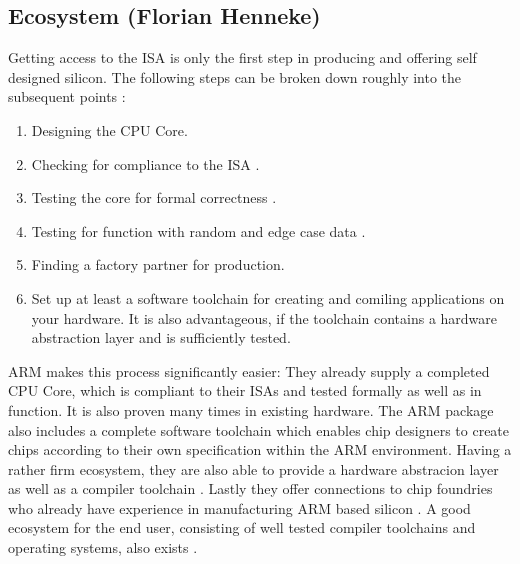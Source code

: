 \documentclass[conference]{IEEEtran}
\begin{document}
	\subsection{Ecosystem (Florian Henneke)}
	\label{ecosystem}
	Getting access to the ISA is only the first step in producing and offering self designed silicon.
	The following steps can be broken down roughly into the subsequent points \cite{ARM2019}:
	\begin{enumerate}
		\item Designing the CPU Core.
		\item Checking for compliance to the ISA \cite{Bartley2020}.
		\item Testing the core for formal correctness \cite{Bartley2020}.
		\item Testing for function with random and edge case data \cite{Bartley2020}.
		\item Finding a factory partner for production.
		\item Set up at least a software toolchain for creating and comiling applications on your hardware. It is also advantageous, if the toolchain contains a hardware abstraction layer and is sufficiently tested.
	\end{enumerate}
	ARM makes this process significantly easier: They already supply a completed CPU Core, which is compliant to their \glspl{ISA} and tested formally as well as in function. It is also proven many times in existing hardware. The ARM package also includes a complete software toolchain which enables chip designers to create chips according to their own specification within the ARM environment. Having a rather firm ecosystem, they are also able to provide a hardware abstracion layer as well as a compiler toolchain \cite{CMSIS}. Lastly they offer connections to chip foundries who already have experience in manufacturing ARM based silicon \cite{ARM2019}.
	A good ecosystem for the end user, consisting of well tested compiler toolchains \cite{ARMGNU} and operating systems, also exists \cite{Microsoft2020}\cite{RedHat}.
\end{document}
